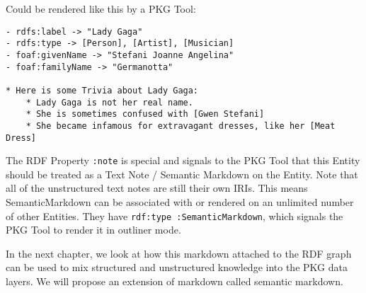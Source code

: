 Could be rendered like this by a PKG Tool:

\begin{verbatim}
- rdfs:label -> "Lady Gaga"
- rdfs:type -> [Person], [Artist], [Musician]
- foaf:givenName -> "Stefani Joanne Angelina"
- foaf:familyName -> "Germanotta"

* Here is some Trivia about Lady Gaga:
    * Lady Gaga is not her real name.
    * She is sometimes confused with [Gwen Stefani]
    * She became infamous for extravagant dresses, like her [Meat Dress]
\end{verbatim}


The RDF Property \verb|:note| is special and signals to the PKG Tool that this Entity should be treated as a Text Note / Semantic Markdown on the Entity. Note that all of the unstructured text notes are still their own IRIs. This means SemanticMarkdown can be associated with or rendered on an unlimited number of other Entities. They have \verb|rdf:type :SemanticMarkdown|, which signals the PKG Tool to render it in outliner mode.

In the next chapter, we look at how this markdown attached to the RDF graph can be used to mix structured and unstructured knowledge into the PKG data layers. We will propose an extension of markdown called semantic markdown.
